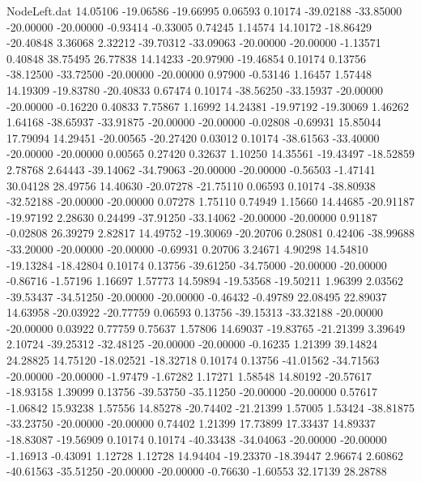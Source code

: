 \begin{filecontents}{NodeLeft.dat}
  14.05106  -19.06586  -19.66995     0.06593    0.10174  -39.02188  -33.85000  -20.00000  -20.00000   -0.93414   -0.33005    0.74245    1.14574
  14.10172  -18.86429  -20.40848     3.36068    2.32212  -39.70312  -33.09063  -20.00000  -20.00000   -1.13571    0.40848   38.75495   26.77838
  14.14233  -20.97900  -19.46854     0.10174    0.13756  -38.12500  -33.72500  -20.00000  -20.00000    0.97900   -0.53146    1.16457    1.57448
  14.19309  -19.83780  -20.40833     0.67474    0.10174  -38.56250  -33.15937  -20.00000  -20.00000   -0.16220    0.40833    7.75867    1.16992
  14.24381  -19.97192  -19.30069     1.46262    1.64168  -38.65937  -33.91875  -20.00000  -20.00000   -0.02808   -0.69931   15.85044   17.79094
  14.29451  -20.00565  -20.27420     0.03012    0.10174  -38.61563  -33.40000  -20.00000  -20.00000    0.00565    0.27420    0.32637    1.10250
  14.35561  -19.43497  -18.52859     2.78768    2.64443  -39.14062  -34.79063  -20.00000  -20.00000   -0.56503   -1.47141   30.04128   28.49756
  14.40630  -20.07278  -21.75110     0.06593    0.10174  -38.80938  -32.52188  -20.00000  -20.00000    0.07278    1.75110    0.74949    1.15660
  14.44685  -20.91187  -19.97192     2.28630    0.24499  -37.91250  -33.14062  -20.00000  -20.00000    0.91187   -0.02808   26.39279    2.82817
  14.49752  -19.30069  -20.20706     0.28081    0.42406  -38.99688  -33.20000  -20.00000  -20.00000   -0.69931    0.20706    3.24671    4.90298
  14.54810  -19.13284  -18.42804     0.10174    0.13756  -39.61250  -34.75000  -20.00000  -20.00000   -0.86716   -1.57196    1.16697    1.57773
  14.59894  -19.53568  -19.50211     1.96399    2.03562  -39.53437  -34.51250  -20.00000  -20.00000   -0.46432   -0.49789   22.08495   22.89037
  14.63958  -20.03922  -20.77759     0.06593    0.13756  -39.15313  -33.32188  -20.00000  -20.00000    0.03922    0.77759    0.75637    1.57806
  14.69037  -19.83765  -21.21399     3.39649    2.10724  -39.25312  -32.48125  -20.00000  -20.00000   -0.16235    1.21399   39.14824   24.28825
  14.75120  -18.02521  -18.32718     0.10174    0.13756  -41.01562  -34.71563  -20.00000  -20.00000   -1.97479   -1.67282    1.17271    1.58548
  14.80192  -20.57617  -18.93158     1.39099    0.13756  -39.53750  -35.11250  -20.00000  -20.00000    0.57617   -1.06842   15.93238    1.57556
  14.85278  -20.74402  -21.21399     1.57005    1.53424  -38.81875  -33.23750  -20.00000  -20.00000    0.74402    1.21399   17.73899   17.33437
  14.89337  -18.83087  -19.56909     0.10174    0.10174  -40.33438  -34.04063  -20.00000  -20.00000   -1.16913   -0.43091    1.12728    1.12728
  14.94404  -19.23370  -18.39447     2.96674    2.60862  -40.61563  -35.51250  -20.00000  -20.00000   -0.76630   -1.60553   32.17139   28.28788

\end{filecontents}
